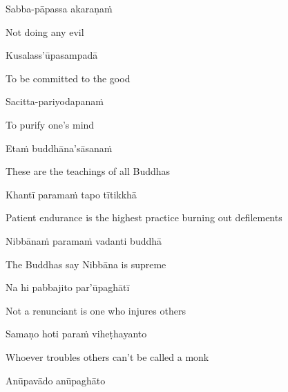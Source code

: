 Sabba-pāpassa akaraṇaṁ\makeatletter\hyperlink{endnote33-appendix}\makeatother

\begin{english}
  Not doing any evil
\end{english}

Kusalass'ūpasampadā

\begin{english}
  To be committed to the good
\end{english}

Sacitta-pariyodapanaṁ

\begin{english}
  To purify one's mind
\end{english}

Etaṁ buddhāna'sāsanaṁ

\begin{english}
  These are the teachings of all Buddhas
\end{english}

Khantī paramaṁ tapo tītikkhā

\begin{english}
  Patient endurance is the highest practice burning out defilements
\end{english}

Nibbānaṁ paramaṁ vadanti buddhā

\begin{english}
  The Buddhas say Nibbāna is supreme
\end{english}

Na hi pabbajito par'ūpaghātī

\begin{english}
  Not a renunciant is one who injures others
\end{english}

Samaṇo hoti paraṁ viheṭhayanto

\begin{english}
  Whoever troubles others can't be called a monk
\end{english}

Anūpavādo anūpaghāto


